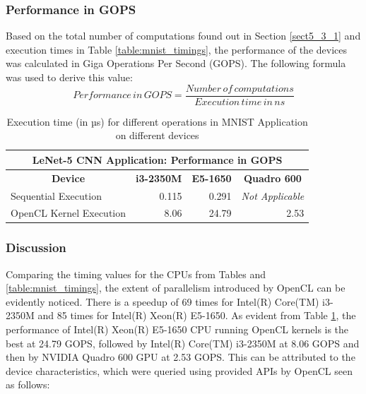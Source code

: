 \subsubsection*{Performance in GOPS}
\label{sect5_3_3_a}
Based on the total number of computations found out in Section \ref{sect5_3_1} and execution times in Table \ref{table:mnist_timings}, the performance of the devices was calculated in Giga Operations Per Second (\ac{GOPS}). The following formula was used to derive this value:
\[Performance \, in \, GOPS=\frac{Number \, of \, computations}{Execution \, time \, in \, ns}\]

\begin{table}[h!]
\centering
 \caption{Execution time (in µs) for different operations in MNIST Application on different devices}
 \vspace{3mm}
 \renewcommand\arraystretch{1.6}
 \begin{tabular}{ | m{12em} | r | r | r |  }
 \hline
 \multicolumn{4}{|c|}{LeNet-5 CNN Application: Performance in GOPS} \\
 \hline
 \multicolumn{1}{|c|}{\bfseries Device} & \multicolumn{1}{c|}{\bfseries i3-2350M} & \multicolumn{1}{c|}{\bfseries E5-1650} & \multicolumn{1}{c|}{\bfseries Quadro 600} \\
 \hline
 Sequential Execution & 0.115 &  0.291 & \textit{Not Applicable} \\\hline
 OpenCL Kernel Execution & 8.06 &  24.79 & 2.53 \\
 
 \hline
 \end{tabular}
 \label{table:mnist_gops}
\end{table}

\subsubsection*{Discussion}
\label{sect5_3_3_b}

Comparing the timing values for the CPUs from Tables and \ref{table:mnist_timings}, the extent of parallelism introduced by OpenCL can be evidently noticed. There is a speedup of 69 times for Intel(R) Core(TM) i3-2350M and 85 times for Intel(R) Xeon(R) E5-1650. \newline\newline
As evident from Table \ref{table:mnist_gops}, the performance of Intel(R) Xeon(R) E5-1650 CPU running OpenCL kernels is the best at 24.79 GOPS, followed by Intel(R) Core(TM) i3-2350M at 8.06 GOPS and then by NVIDIA Quadro 600 GPU at 2.53 GOPS. This can be attributed to the device characteristics, which were queried using provided APIs by OpenCL seen as follows:

